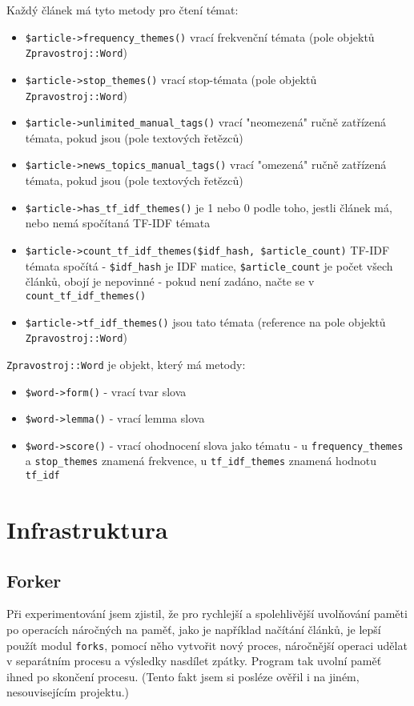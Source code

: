 \documentclass[12pt,a4paper]{report}
\begin{document}
Každý článek má tyto metody pro čtení témat:

\begin{itemize}
	\item \texttt{\$article->frequency\_themes()} vrací frekvenční témata (pole objektů \texttt{Zpravostroj::Word})
	\item \texttt{\$article->stop\_themes()} vrací stop-témata (pole objektů \texttt{Zpravostroj::Word})
	\item \texttt{\$article->unlimited\_manual\_tags()} vrací "neomezená" ručně zatřízená témata, pokud jsou (pole textových řetězců)
	\item \texttt{\$article->news\_topics\_manual\_tags()} vrací "omezená" ručně zatřízená témata, pokud jsou (pole textových řetězců)
	\item \texttt{\$article->has\_tf\_idf\_themes()} je 1 nebo 0 podle toho, jestli článek má, nebo nemá spočítaná TF-IDF témata
	\item \texttt{\$article->count\_tf\_idf\_themes(\$idf\_hash, \$article\_count)} TF-IDF témata spočítá - \texttt{\$idf\_hash} je IDF matice, \texttt{\$article\_count} je počet všech článků, obojí je nepovinné - pokud není zadáno, načte se v \texttt{count\_tf\_idf\_themes()}
	\item \texttt{\$article->tf\_idf\_themes()} jsou tato témata (reference na pole objektů \texttt{Zpravostroj::Word})
\end{itemize}
	
\texttt{Zpravostroj::Word} je objekt, který má metody:
\begin{itemize}
	\item \texttt{\$word->form()} - vrací tvar slova
	\item \texttt{\$word->lemma()} - vrací lemma slova
	\item \texttt{\$word->score()} - vrací ohodnocení slova jako tématu - u \texttt{frequency\_themes} a \texttt{stop\_themes} znamená frekvence, u \texttt{tf\_idf\_themes} znamená hodnotu \texttt{tf\_idf}
\end{itemize}

\section{Infrastruktura}
				
\subsection{Forker}
\label{sec:forker}
Při experimentování jsem zjistil, že pro rychlejší a spolehlivější uvolňování paměti po operacích náročných na paměť, jako je například načítání článků, je lepší použít modul \texttt{forks}, pomocí něho vytvořit nový proces, náročnější operaci udělat v separátním procesu a výsledky nasdílet zpátky. Program tak uvolní paměť ihned po skončení procesu. (Tento fakt jsem si posléze ověřil i na jiném, nesouvisejícím projektu.)
\end{document}
